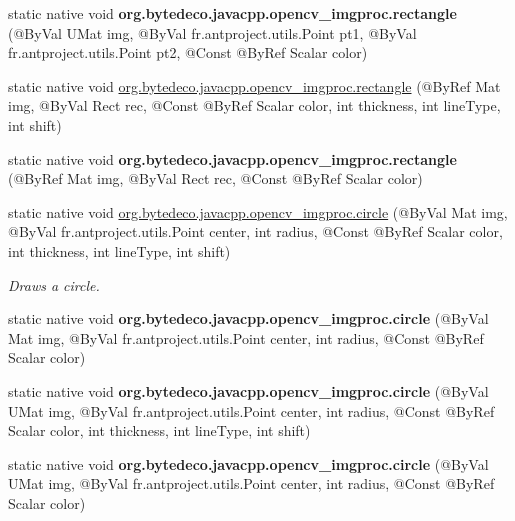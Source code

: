 \begin{DoxyCompactItemize}
\item 
\mbox{\label{group__imgproc__draw_ga4c619e8273911d134b6bd84ccb3724d6}} 
static native void {\bfseries org.\+bytedeco.\+javacpp.\+opencv\+\_\+imgproc.\+rectangle} (@By\+Val U\+Mat img, @By\+Val fr.antproject.utils.Point pt1, @By\+Val fr.antproject.utils.Point pt2, @Const @By\+Ref Scalar color)
\item 
static native void \hyperlink{group__imgproc__draw_ga35715bd59f4d006c97366b20cdc4499e}{org.\+bytedeco.\+javacpp.\+opencv\+\_\+imgproc.\+rectangle} (@By\+Ref Mat img, @By\+Val Rect rec, @Const @By\+Ref Scalar color, int thickness, int line\+Type, int shift)
\item 
\mbox{\label{group__imgproc__draw_ga9fac76aca098ad47684c5804868f9682}} 
static native void {\bfseries org.\+bytedeco.\+javacpp.\+opencv\+\_\+imgproc.\+rectangle} (@By\+Ref Mat img, @By\+Val Rect rec, @Const @By\+Ref Scalar color)
\item 
static native void \hyperlink{group__imgproc__draw_ga6f8e5000cb25b63d5885b12d46f52e39}{org.\+bytedeco.\+javacpp.\+opencv\+\_\+imgproc.\+circle} (@By\+Val Mat img, @By\+Val fr.antproject.utils.Point center, int radius, @Const @By\+Ref Scalar color, int thickness, int line\+Type, int shift)
\begin{DoxyCompactList}\small\item\em Draws a circle. \end{DoxyCompactList}\item 
\mbox{\label{group__imgproc__draw_ga2ff61979b3c9fb771860cf9caa93b355}} 
static native void {\bfseries org.\+bytedeco.\+javacpp.\+opencv\+\_\+imgproc.\+circle} (@By\+Val Mat img, @By\+Val fr.antproject.utils.Point center, int radius, @Const @By\+Ref Scalar color)
\item 
\mbox{\label{group__imgproc__draw_ga0fdb4a805b574c13646ae989c13bd03a}} 
static native void {\bfseries org.\+bytedeco.\+javacpp.\+opencv\+\_\+imgproc.\+circle} (@By\+Val U\+Mat img, @By\+Val fr.antproject.utils.Point center, int radius, @Const @By\+Ref Scalar color, int thickness, int line\+Type, int shift)
\item 
\mbox{\label{group__imgproc__draw_ga8c97216153de676f2d1f6afffa712e91}} 
static native void {\bfseries org.\+bytedeco.\+javacpp.\+opencv\+\_\+imgproc.\+circle} (@By\+Val U\+Mat img, @By\+Val fr.antproject.utils.Point center, int radius, @Const @By\+Ref Scalar color)

\end{DoxyCompactItemize}
